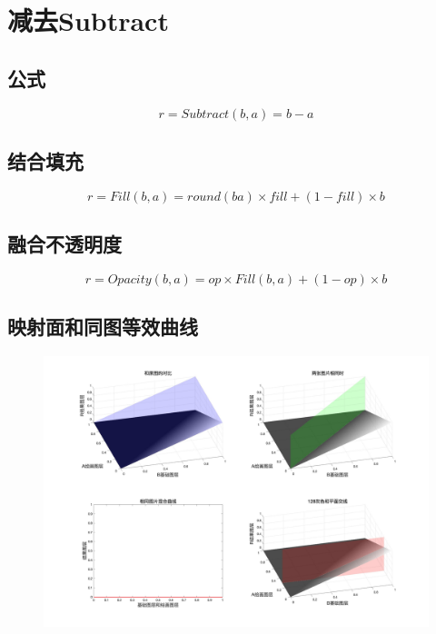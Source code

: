 \section{ 减去Subtract}

\subsection{ 公式}

\begin{equation}r=Subtract(b,a)= b-a\end{equation}

\subsection{ 结合填充}

\begin{equation}r=Fill(b,a)=round(ba)\times fill + (1-fill)\times b\end{equation}

\subsection{ 融合不透明度}

\begin{equation}r=Opacity(b,a)=op\times Fill(b,a)+(1-op)\times b\end{equation}

\subsection{ 映射面和同图等效曲线}
\begin{figure}[h!]
	\centering
	\includegraphics[width=\linewidth]{figure/减去}
	\caption{}
	\label{fig:}
\end{figure}

